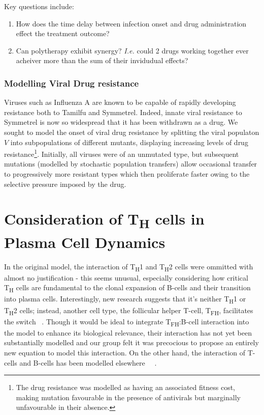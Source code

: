 \documentclass[a4paper, 12pt]{report}
\begin{document}
Key questions include:
\begin{enumerate}
\item How does the time delay between infection onset and drug administration effect the treatment outcome?
\item Can polytherapy exhibit synergy? \textit{I.e.} could 2 drugs working together ever acheiver more than the sum of their invidudual effects?
\end{enumerate}

\subsubsection{Modelling Viral Drug resistance}

Viruses such as Influenza A are known to be capable of rapidly developing resistance both to Tamilfu and Symmetrel.
Indeed, innate viral resistance to Symmetrel is now so widespread that it has been withdrawn as a drug.
We sought to model the onset of viral drug resistance by splitting the viral populaton $V$ into subpopulations of different mutants, displaying increasing levels of drug resistance\footnote{The drug resistance was modelled as having an associated fitness cost, making mutation favourable in the presence of antivirals but marginally unfavourable in their absence.}. Initially, all viruses were of an unmutated type, but subsequent mutations (modelled by stochastic population transfers) allow occasional transfer to progressively more resistant types which then proliferate faster owing to the selective pressure imposed by the drug.

\section{Consideration of T\textsubscript{H} cells in Plasma Cell Dynamics} %
In the original model, the interaction of T\textsubscript{H}1 and T\textsubscript{H}2 cells were ommitted with almost no justification - this seems unusual, especially considering how critical T\textsubscript{H} cells are fundamental to the clonal expansion of B-cells and their transition into plasma cells. Interestingly, new research suggests that it's neither T\textsubscript{H}1 or T\textsubscript{H}2 cells; instead, another cell type, the follicular helper T-cell, T\textsubscript{FH}, facilitates the switch ~\cite{Swain}. Though it would be ideal to integrate T\textsubscript{FH}:B-cell interaction into the model to enhance its biological relevance, their interaction has not yet been substantially modelled and our group felt it was precocious to propose an entirely new equation to model this interaction. On the other hand, the interaction of T-cells and B-cells has been modelled elsewhere ~\cite{Carneiro1}~\cite{Carneiro2}.\\ 
\end{document}
